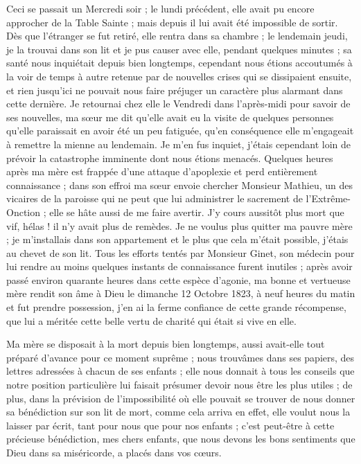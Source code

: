 \documentclass[11pt,a4paper]{report}
\begin{document}
Ceci se passait un Mercredi soir ; le lundi précédent, elle avait pu encore approcher de la Table Sainte ; mais depuis il lui avait été impossible de sortir. Dès que l'étranger se fut retiré, elle rentra dans sa chambre ; le lendemain jeudi, je la trouvai dans son lit et je pus causer avec elle, pendant quelques minutes ; sa santé nous inquiétait depuis bien longtemps, cependant nous étions accoutumés à la voir de temps à autre retenue par de nouvelles crises qui se dissipaient ensuite, et rien jusqu'ici ne pouvait nous faire préjuger un caractère plus alarmant dans cette dernière. Je retournai chez elle le Vendredi dans l'après-midi pour savoir de ses nouvelles, ma sœur me dit qu'elle avait eu la visite de quelques personnes qu'elle paraissait en avoir été un peu fatiguée, qu'en conséquence elle m'engageait à remettre la mienne au lendemain. Je m'en fus inquiet, j'étais cependant loin de prévoir la catastrophe imminente dont nous étions menacés. Quelques heures après ma mère est frappée d'une attaque d'apoplexie et perd entièrement connaissance ; dans son effroi ma sœur envoie chercher Monsieur Mathieu, un des vicaires de la paroisse qui ne peut que lui administrer le sacrement de l'Extrême-Onction ; elle se hâte aussi de me faire avertir. J'y cours aussitôt plus mort que vif, hélas ! il n'y avait plus de remèdes. Je ne voulus plus quitter ma pauvre mère ; je m'installais dans son appartement et le plus que cela m'était possible, j'étais au chevet de son lit. Tous les efforts tentés par Monsieur Ginet, son médecin pour lui rendre au moins quelques instants de connaissance furent inutiles ; après avoir passé environ quarante heures dans cette espèce d'agonie, ma bonne et vertueuse mère rendit son âme à Dieu le dimanche 12 Octobre 1823, à neuf heures du matin et fut prendre possession, j'en ai la ferme confiance de cette grande récompense, que lui a méritée cette belle vertu de charité qui était si vive en elle.

Ma mère se disposait à la mort depuis bien longtemps, aussi avait-elle tout préparé d'avance pour ce moment suprême ; nous trouvâmes dans ses papiers, des lettres adressées à chacun de ses enfants ; elle nous donnait à tous les conseils que notre position particulière lui faisait présumer devoir nous être les plus utiles ; de plus, dans la prévision de l'impossibilité où elle pouvait se trouver de nous donner sa bénédiction sur son lit de mort, comme cela arriva en effet, elle voulut nous la laisser par écrit, tant pour nous que pour nos enfants ; c'est peut-être à cette précieuse bénédiction, mes chers enfants, que nous devons les bons sentiments que Dieu dans sa miséricorde, a placés dans vos cœurs.
\end{document}
